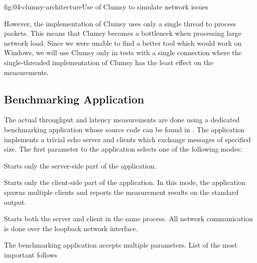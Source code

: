 \begin{myFigure}{fig:04-clumsy-architecture}{Use of Clumsy to simulate network issues}

  \resizebox{0.8\linewidth}{!}{}

\end{myFigure}

However, the implementation of Clumsy uses only a single thread to process packets. This means that
Clumsy becomes a bottleneck when processing large network load.  Since we were unable to find a
better tool which would work on Windows, we will use Clumsy only in tests with a single connection
where the single-threaded implementation of Clumsy has the least effect on the measurements.

\subsection{Benchmarking Application}\label{sec:04-benchmark-app}

The actual throughput and latency measurements are done using a dedicated benchmarking \dotnet{}
application whose source code can be found in . The application implements
a trivial echo server and clients which exchange messages of specified size. The first parameter
to the application selects one of the following modes:

\begin{description}

   Starts only the server-side part of the application.

   Starts only the client-side part of the application. In this mode, the
application spawns multiple clients and reports the measurement results on the standard output.

   Starts both the server and client in the same process. All network
communication is done over the loopback network interface.

\end{description}

The benchmarking application accepts multiple parameters. List of the most important follows

